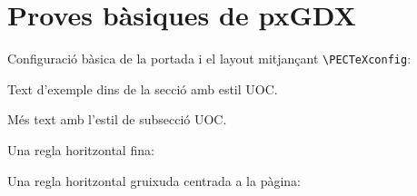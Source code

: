 \documentclass[cat,no-cover,no-toc]{P3CTeX}
\begin{document}
\PECTeXprintCover
\PECTeXprintTOC*

\section*{Proves bàsiques de pxGDX}

Configuració bàsica de la portada i el layout mitjançant \texttt{\textbackslash PECTeXconfig}:




Text d'exemple dins de la secció amb estil UOC.

Més text amb l'estil de subsecció UOC.

Una regla horitzontal fina:
\pxHRule

Una regla horitzontal gruixuda centrada a la pàgina:
\pxPageRule*
\end{document}
